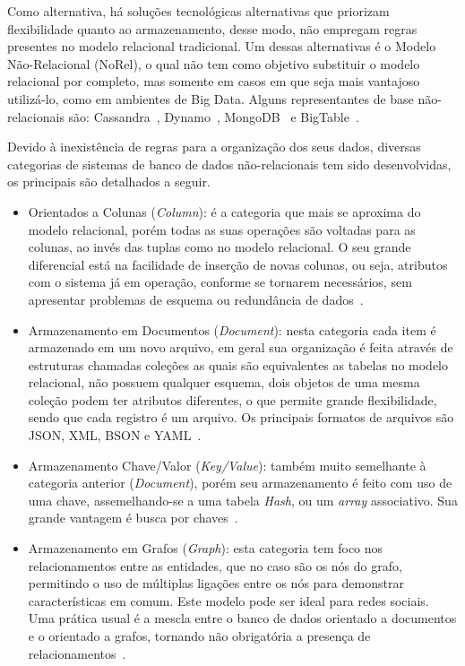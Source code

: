 Como alternativa, há soluções tecnológicas alternativas que priorizam flexibilidade quanto ao armazenamento, desse modo, não empregam regras presentes no modelo relacional tradicional. Um dessas alternativas é o Modelo Não-Relacional (NoRel), o qual não tem como objetivo substituir o modelo relacional por completo, mas somente em casos em que seja mais vantajoso utilizá-lo, como em ambientes de Big Data. Alguns representantes de base não-relacionais são: Cassandra~\cite{cassandra2014apache}, Dynamo~\cite{sivasubramanian2012amazon}, MongoDB~\cite{banker2011mongodb} e BigTable~\cite{chang2008bigtable}.

Devido à inexistência de regras para a organização dos seus dados, diversas categorias de sistemas de banco de dados não-relacionais tem sido desenvolvidas, os principais são detalhados a seguir.


\begin{itemize}
\item Orientados a Colunas (\textit{Column}): é a categoria que mais se aproxima do modelo relacional, porém todas as suas operações são voltadas para as colunas, ao invés das tuplas como no modelo relacional. O seu grande diferencial está na facilidade de inserção de novas colunas, ou seja, atributos com o sistema já em operação, conforme se tornarem necessários, sem apresentar problemas de esquema ou redundância de dados~\cite{vaish2013getting}.

\item Armazenamento em Documentos (\textit{Document}): nesta categoria cada item é armazenado em um novo arquivo, em geral sua organização é feita através de estruturas chamadas coleções as quais são equivalentes as tabelas no modelo relacional, não possuem qualquer esquema, dois objetos de uma mesma coleção podem ter atributos diferentes, o que permite grande flexibilidade, sendo que cada registro é um arquivo. Os principais formatos de arquivos são JSON, XML, BSON e YAML~\cite{vaish2013getting}.

\item Armazenamento Chave/Valor (\textit{Key/Value}): também muito semelhante à categoria anterior (\textit{Document}), porém seu armazenamento é feito com uso de uma chave, assemelhando-se a uma tabela \textit{Hash}, ou um \textit{array} associativo. Sua grande vantagem é busca por chaves~\cite{vaish2013getting}.

\item Armazenamento em Grafos (\textit{Graph}): esta categoria tem foco nos relacionamentos entre as entidades, que no caso são os nós do grafo, permitindo o uso de múltiplas ligações entre os nós para demonstrar características em comum. Este modelo pode ser ideal para redes sociais. Uma prática usual é a mescla entre o banco de dados orientado a documentos e o orientado a grafos, tornando não obrigatória a presença de relacionamentos~\cite{vaish2013getting}.

\end{itemize}


